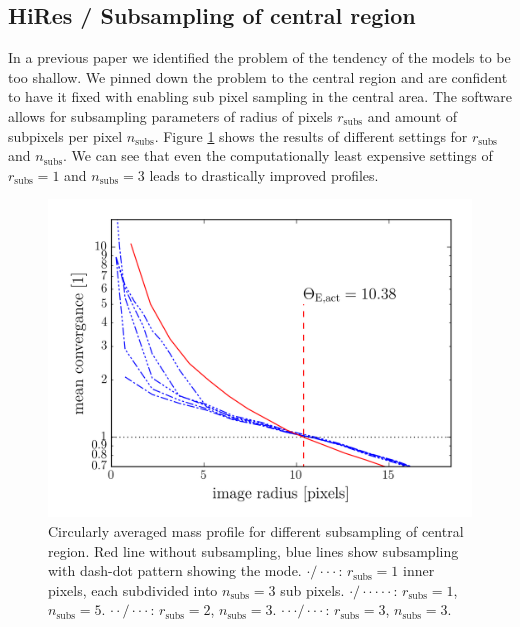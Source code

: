 \documentclass[fleqn,usenatbib]{mnras}
\newcommand{\Figref}[1]{Figure \ref{fig:#1}}
\begin{document}
\subsection{HiRes / Subsampling of central region}
In a previous paper \cite{2015MNRAS.447.2170K} we identified the problem of the tendency of the models to be too shallow.
We pinned down the problem to the central region and are confident to have it fixed with enabling sub pixel sampling in the central area.
The software allows for subsampling parameters of radius of pixels $r_\text{subs}$ and amount of subpixels per pixel $n_\text{subs}$.
\Figref{subsampling} shows the results of different settings for $r_\text{subs}$ and $n_\text{subs}$.
We can see that even the computationally least expensive settings of $r_\text{subs}=1$ and $n_\text{subs}=3$ leads to drastically improved profiles.

\begin{figure}
  \includegraphics[width=\linewidth]{hires/007022_kappa_encl}
  \caption{
    Circularly averaged mass profile for different subsampling of central region.
    Red line without subsampling, blue lines show subsampling with dash-dot pattern showing the mode.
    $\cdot / \cdot \cdot \cdot$: $r_\text{subs}=1$ inner pixels, each subdivided into $n_\text{subs}=3$ sub pixels.
    $\cdot / \cdot \cdot \cdot \cdot \cdot$: $r_\text{subs}=1$, $n_\text{subs}=5$.
    $\cdot \cdot / \cdot \cdot \cdot $: $r_\text{subs}=2$, $n_\text{subs}=3$.
    $\cdot \cdot \cdot / \cdot \cdot \cdot $: $r_\text{subs}=3$, $n_\text{subs}=3$.
    }
  \label{fig:subsampling}
\end{figure}
\end{document}
